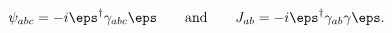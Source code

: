 \begin{equation}
\psi_{abc} = -i \eps^{\dagger} \gamma_{abc} \eps \qquad \mbox{and} \qquad
J_{ab} = -i \eps^{\dagger} \gamma_{ab}\gamma \eps . \label{6dgb}
\end{equation}

